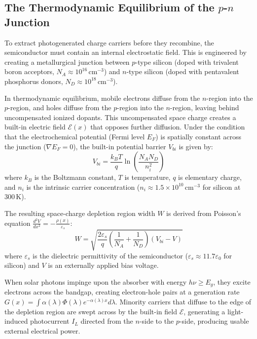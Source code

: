\subsection{The Thermodynamic Equilibrium of the \texorpdfstring{$p$-$n$}{p-n} Junction}

To extract photogenerated charge carriers before they recombine, the semiconductor must contain an internal electrostatic field. This is engineered by creating a metallurgical junction between $p$-type silicon (doped with trivalent boron acceptors, $N_A \approx 10^{16}\,\mathrm{cm}^{-3}$) and $n$-type silicon (doped with pentavalent phosphorus donors, $N_D \approx 10^{18}\,\mathrm{cm}^{-3}$).

In thermodynamic equilibrium, mobile electrons diffuse from the $n$-region into the $p$-region, and holes diffuse from the $p$-region into the $n$-region, leaving behind uncompensated ionized dopants. This uncompensated space charge creates a built-in electric field $\mathcal{E}(x)$ that opposes further diffusion. Under the condition that the electrochemical potential (Fermi level $E_F$) is spatially constant across the junction ($\nabla E_F = 0$), the built-in potential barrier $V_{bi}$ is given by:
\begin{equation}
V_{bi} = \frac{k_B T}{q} \ln\left( \frac{N_A N_D}{n_i^2} \right)
\label{eq:built_in_potential}
\end{equation}
where $k_B$ is the Boltzmann constant, $T$ is temperature, $q$ is elementary charge, and $n_i$ is the intrinsic carrier concentration ($n_i \approx 1.5 \times 10^{10}\,\mathrm{cm}^{-3}$ for silicon at $300\,\mathrm{K}$).

The resulting space-charge depletion region width $W$ is derived from Poisson's equation $\frac{d^2 V}{dx^2} = -\frac{\rho(x)}{\varepsilon_s}$:
\begin{equation}
W = \sqrt{ \frac{2 \varepsilon_s}{q} \left( \frac{1}{N_A} + \frac{1}{N_D} \right) (V_{bi} - V) }
\label{eq:depletion_width}
\end{equation}
where $\varepsilon_s$ is the dielectric permittivity of the semiconductor ($\varepsilon_s \approx 11.7 \varepsilon_0$ for silicon) and $V$ is an externally applied bias voltage.

When solar photons impinge upon the absorber with energy $h\nu \ge E_g$, they excite electrons across the bandgap, creating electron-hole pairs at a generation rate $G(x) = \int \alpha(\lambda) \Phi(\lambda) e^{-\alpha(\lambda) x} d\lambda$. Minority carriers that diffuse to the edge of the depletion region are swept across by the built-in field $\mathcal{E}$, generating a light-induced photocurrent $I_L$ directed from the $n$-side to the $p$-side, producing usable external electrical power.


